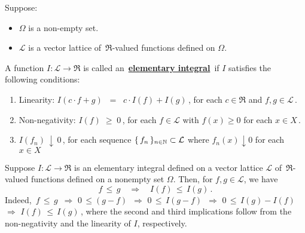 
\begin{definition}
\mbox{}\vskip 0.1cm
\noindent
Suppose:
\begin{itemize}
\item
	$\Omega$ is a non-empty set.
\item
	$\mathcal{L}$ is a vector lattice of \,$\Re$-valued functions defined on $\Omega$.
\end{itemize}
A function $I : \mathcal{L} \longrightarrow \Re$ is called an \,\underline{\textbf{elementary integral}}\,
if $I$ satisfies the following conditions:
\begin{enumerate}
\item
	Linearity:\;\;
	$I(c \cdot f + g) \;\; = \;\; c \cdot I(f) + I(g)$\,,
	for each $c \in \Re$ and $f, g \in \mathcal{L}$\,.
\item
	Non-negativity:\;\; $I(f) \; \geq \; 0$\,,\;\;
	for each $f \in \mathcal{L}$ with $f(x) \geq 0$ for each $x \in X$\,.
\item
	$I(f_{n}) \, \downarrow \, 0$\,,
	for each sequence $\{\,f_{n}\,\}_{n\in\mathbb{N}} \subset \mathcal{L}$ where $f_{n}(x) \downarrow 0$ for each $x \in X$
\end{enumerate}
\end{definition}


\begin{remark}\label{ElementaryIntegralsPreserveInequalities}\quad
Suppose $I : \mathcal{L} \longrightarrow \Re$ is an elementary integral
defined on a vector lattice $\mathcal{L}$ of \,$\Re$-valued functions
defined on a nonempty set $\Omega$.
Then, for $f, g \in \mathcal{L}$, we have
\begin{equation*}
f \,\leq\, g \quad\Longrightarrow\quad I(f) \,\leq\, I(g)\,.
\end{equation*}
Indeed,\,
$f\,\leq\,g$
\,\;$\Longrightarrow$\; $0\,\leq (g-f)$
\,\;$\Longrightarrow$\; $0\,\leq\,I(g-f)$
\,\;$\Longrightarrow$\; $0\,\leq\,I(g)-I(f)$
\,\;$\Longrightarrow$\; $I(f) \,\leq\, I(g)$\,,
where the second and third implications follow from the non-negativity and the linearity of $I$, respectively.
\end{remark}


